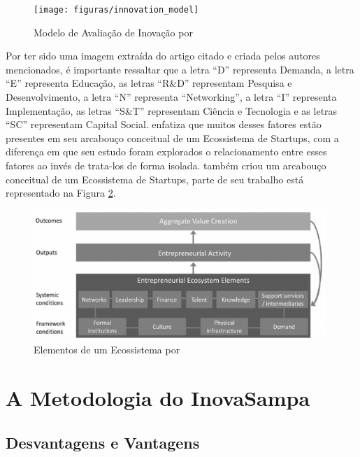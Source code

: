 \begin{figure}[!htb]
\centering
\texttt{[image: figuras/innovation\_model]}
\caption{Modelo de Avaliação de Inovação por }
\label{figure:innovation_model}
\end{figure}

Por ter sido uma imagem extraída do artigo citado e criada pelos autores mencionados, é importante ressaltar que a letra ``D'' representa Demanda, a letra ``E'' representa Educação, as letras ``R\&D'' representam Pesquisa e Desenvolvimento, a letra ``N'' representa ``Networking'', a letra ``I'' representa Implementação, as letras ``S\&T'' representam Ciência e Tecnologia e as letras ``SC'' representam Capital Social.  enfatiza que muitos desses fatores estão presentes em seu arcabouço conceitual de um Ecossistema de Startups, com a diferença em que seu estudo foram explorados o relacionamento entre esses fatores ao invés de trata-los de forma isolada.  também criou um arcabouço conceitual de um Ecossistema de Startups, parte de seu trabalho está representado na Figura \ref{figure:elements_of_an_ecosystem}.

\begin{figure}[!htb]
\centering
\includegraphics[width=11cm,angle=0]{figuras/elements_of_an_ecosystem}
\caption{Elementos de um Ecossistema por }
\label{figure:elements_of_an_ecosystem}
\end{figure}

\section{A Metodologia do InovaSampa}
\label{section:metodologia_do_inovasampa}

\subsection{Desvantagens e Vantagens}
\label{subsection:vantagens_e_desvantagens}


